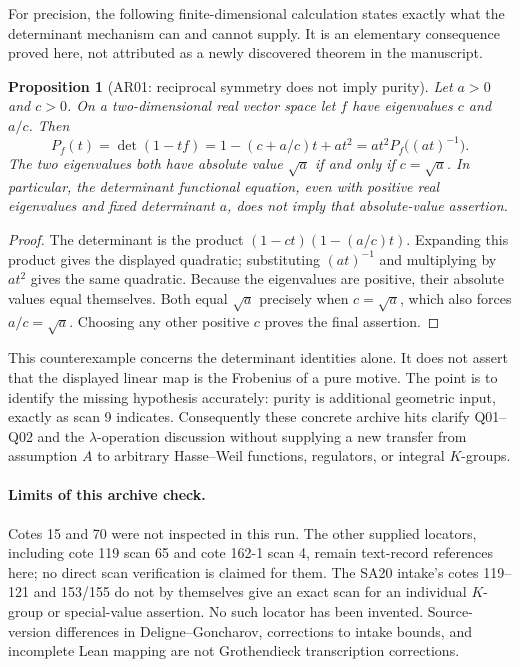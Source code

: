 \documentclass[11pt,a4paper]{article}
\newtheorem{proposition}[theorem]{Proposition}
\theoremstyle{definition}
\begin{document}
For precision, the following finite-dimensional calculation states
exactly what the determinant mechanism can and cannot supply.  It is an
elementary consequence proved here, not attributed as a newly discovered
theorem in the manuscript.

\begin{proposition}[AR01: reciprocal symmetry does not imply purity]
Let \(a>0\) and \(c>0\).  On a two-dimensional real vector space let
\(f\) have eigenvalues \(c\) and \(a/c\).  Then
\[
 P_f(t)=\det(1-tf)
       =1-(c+a/c)t+at^2
       =at^2P_f\bigl((at)^{-1}\bigr).
\]
The two eigenvalues both have absolute value \(\sqrt a\) if and only if
\(c=\sqrt a\).  In particular, the determinant functional equation,
even with positive real eigenvalues and fixed determinant \(a\), does
not imply that absolute-value assertion.
\end{proposition}

\begin{proof}
The determinant is the product \((1-ct)(1-(a/c)t)\).  Expanding this
product gives the displayed quadratic; substituting \((at)^{-1}\)
and multiplying by \(at^2\) gives the same quadratic.  Because the
eigenvalues are positive, their absolute values equal themselves.
Both equal \(\sqrt a\) precisely when \(c=\sqrt a\), which also
forces \(a/c=\sqrt a\).  Choosing any other positive \(c\) proves
the final assertion.
\end{proof}

This counterexample concerns the determinant identities alone.  It does
not assert that the displayed linear map is the Frobenius of a pure
motive.  The point is to identify the missing hypothesis accurately:
purity is additional geometric input, exactly as scan 9 indicates.
Consequently these concrete archive hits clarify Q01--Q02 and the
\(\lambda\)-operation discussion without supplying a new transfer from
assumption \(A\) to arbitrary Hasse--Weil functions, regulators, or
integral \(K\)-groups.

\paragraph{Limits of this archive check.}
Cotes 15 and 70 were not inspected in this run.  The other supplied
locators, including cote 119 scan 65 and cote 162-1 scan 4, remain
text-record references here; no direct scan verification is claimed for
them.  The SA20 intake's cotes 119--121 and 153/155 do not by themselves
give an exact scan for an individual \(K\)-group or special-value
assertion.  No such locator has been invented.  Source-version differences
in Deligne--Goncharov, corrections to intake bounds, and incomplete Lean
mapping are not Grothendieck transcription corrections.
\end{document}
